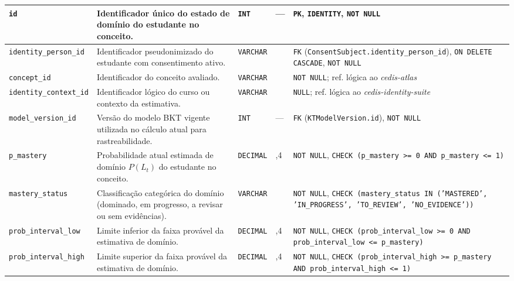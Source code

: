 \begin{anexosenv}
{\begin{longtable}{>{\raggedright\arraybackslash}p{3.0cm}>{\raggedright\arraybackslash}p{4.9cm}>{\raggedright\arraybackslash}p{1.75cm}>{\centering\arraybackslash}p{0.95cm}>{\raggedright\arraybackslash}p{3.7cm}}
\endlastfoot
\texttt{id} & Identificador único do estado de domínio do estudante no conceito. & \texttt{INT} & --- & \texttt{PK}, \texttt{IDENTITY}, \texttt{NOT NULL} \\
\hline
\texttt{identity\_\allowbreak person\_\allowbreak id} & Identificador pseudonimizado do estudante com consentimento ativo. & \texttt{VARCHAR} & 128 & \texttt{FK} (\texttt{ConsentSubject.\allowbreak identity\_\allowbreak person\_\allowbreak id}), \texttt{ON DELETE CASCADE}, \texttt{NOT NULL} \\
\hline
\texttt{concept\_\allowbreak id} & Identificador do conceito avaliado. & \texttt{VARCHAR} & 128 & \texttt{NOT NULL}; ref. lógica ao \textit{cedis-atlas} \\
\hline
\texttt{identity\_\allowbreak context\_\allowbreak id} & Identificador lógico do curso ou contexto da estimativa. & \texttt{VARCHAR} & 128 & \texttt{NULL}; ref. lógica ao \textit{cedis-identity-suite} \\
\hline
\texttt{model\_\allowbreak version\_\allowbreak id} & Versão do modelo BKT vigente utilizada no cálculo atual para rastreabilidade. & \texttt{INT} & --- & \texttt{FK} (\texttt{KTModelVersion.\allowbreak id}), \texttt{NOT NULL} \\
\hline
\texttt{p\_\allowbreak mastery} & Probabilidade atual estimada de domínio $P(L_t)$ do estudante no conceito. & \texttt{DECIMAL} & 5,4 & \texttt{NOT NULL}, \texttt{CHECK (p\_\allowbreak mastery >= 0 AND p\_\allowbreak mastery <= 1)} \\
\hline
\texttt{mastery\_\allowbreak status} & Classificação categórica do domínio (dominado, em progresso, a revisar ou sem evidências). & \texttt{VARCHAR} & 50 & \texttt{NOT NULL}, \texttt{CHECK (mastery\_\allowbreak status IN ('MASTERED', 'IN\_\allowbreak PROGRESS', 'TO\_\allowbreak REVIEW', 'NO\_\allowbreak EVIDENCE'))} \\
\hline
\texttt{prob\_\allowbreak interval\_\allowbreak low} & Limite inferior da faixa provável da estimativa de domínio. & \texttt{DECIMAL} & 5,4 & \texttt{NOT NULL}, \texttt{CHECK (prob\_\allowbreak interval\_\allowbreak low >= 0 AND prob\_\allowbreak interval\_\allowbreak low <= p\_\allowbreak mastery)} \\
\hline
\texttt{prob\_\allowbreak interval\_\allowbreak high} & Limite superior da faixa provável da estimativa de domínio. & \texttt{DECIMAL} & 5,4 & \texttt{NOT NULL}, \texttt{CHECK (prob\_\allowbreak interval\_\allowbreak high >= p\_\allowbreak mastery AND prob\_\allowbreak interval\_\allowbreak high <= 1)} \\

\end{longtable}}
\end{anexosenv}
